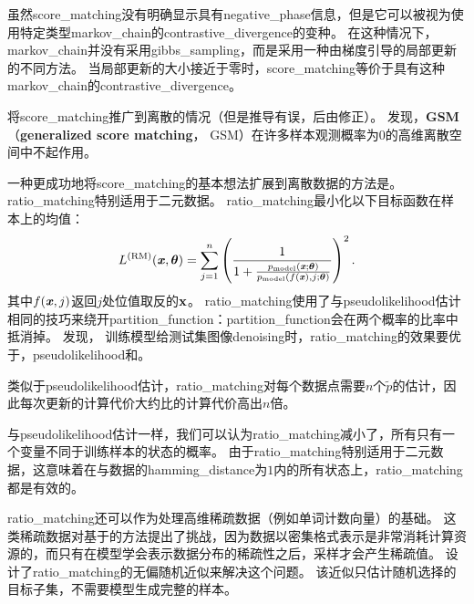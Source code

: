 虽然\gls{score_matching}没有明确显示具有\gls{negative_phase}信息，但是它可以被视为使用特定类型\gls{markov_chain}的\gls{contrastive_divergence}的变种\citep{Hyvarinen-2007b}。
在这种情况下，\gls{markov_chain}并没有采用\gls{gibbs_sampling}，而是采用一种由梯度引导的局部更新的不同方法。
当局部更新的大小接近于零时，\gls{score_matching}等价于具有这种\gls{markov_chain}的\gls{contrastive_divergence}。


\cite{Lyu09}将\gls{score_matching}推广到离散的情况（但是推导有误，后由\cite{Marlin10Inductive-small}修正）。
\cite{Marlin10Inductive-small}发现，\textbf{\gls{GSM}}（\textbf{generalized score matching}， GSM）在许多样本观测概率为$0$的高维离散空间中不起作用。


一种更成功地将\gls{score_matching}的基本想法扩展到离散数据的方法是\citep{Hyvarinen-2007}。
\gls{ratio_matching}特别适用于二元数据。
\gls{ratio_matching}最小化以下目标函数在样本上的均值：
\begin{equation}
	L^{(\text{RM})} (\boldsymbol{\mathit{x}}, \boldsymbol{\theta}) = \sum_{j=1}^n \left( 
	\frac{1}{ 1 + \frac{ p_{\text{model}}(\boldsymbol{\mathit{x}}; \boldsymbol{\theta}) }{ p_{\text{model}}(f(\boldsymbol{\mathit{x}}), j; \boldsymbol{\theta}) } } 
\right)^2.
\end{equation}
其中$f(\boldsymbol{\mathit{x}}, j)$返回$j$处位值取反的$\mathbf{x}$。
\gls{ratio_matching}使用了与\gls{pseudolikelihood}估计相同的技巧来绕开\gls{partition_function}：\gls{partition_function}会在两个概率的比率中抵消掉。
\cite{Marlin10Inductive-small}发现，
训练模型给测试集图像\gls{denoising}时，\gls{ratio_matching}的效果要优于，\gls{pseudolikelihood}和。



类似于\gls{pseudolikelihood}估计，\gls{ratio_matching}对每个数据点需要$n$个$\tilde{p}$的估计，因此每次更新的计算代价大约比的计算代价高出$n$倍。


与\gls{pseudolikelihood}估计一样，我们可以认为\gls{ratio_matching}减小了，所有只有一个变量不同于训练样本的状态的概率。
由于\gls{ratio_matching}特别适用于二元数据，这意味着在与数据的\gls{hamming_distance}为$1$内的所有状态上，\gls{ratio_matching}都是有效的。


\gls{ratio_matching}还可以作为处理高维稀疏数据（例如单词计数向量）的基础。
这类稀疏数据对基于的方法提出了挑战，因为数据以密集格式表示是非常消耗计算资源的，而只有在模型学会表示数据分布的稀疏性之后，采样才会产生稀疏值。
\cite{Dauphin+Bengio-NIPS2013}设计了\gls{ratio_matching}的无偏随机近似来解决这个问题。
该近似只估计随机选择的目标子集，不需要模型生成完整的样本。


